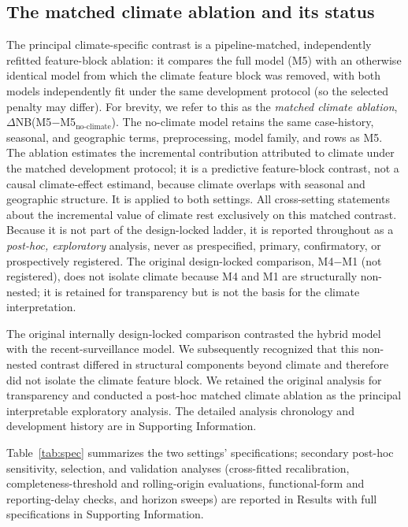 \documentclass[11pt,a4paper]{article}
\begin{document}
\subsection{The matched climate ablation and its status}
The principal climate-specific contrast is a pipeline-matched, independently refitted feature-block ablation: it compares the full model (M5) with an otherwise identical model from which the climate feature block was removed, with both models independently fit under the same development protocol (so the selected penalty may differ). For brevity, we refer to this as the \emph{matched climate ablation}, $\Delta$NB(M5$-$M5$_{\text{no-climate}}$). The no-climate model retains the same case-history, seasonal, and geographic terms, preprocessing, model family, and rows as M5. The ablation estimates the incremental contribution attributed to climate under the matched development protocol; it is a predictive feature-block contrast, not a causal climate-effect estimand, because climate overlaps with seasonal and geographic structure. It is applied to both settings. All cross-setting statements about the incremental value of climate rest exclusively on this matched contrast. Because it is not part of the design-locked ladder, it is reported throughout as a \emph{post-hoc, exploratory} analysis, never as prespecified, primary, confirmatory, or prospectively registered. The original design-locked comparison, M4$-$M1 (not registered), does not isolate climate because M4 and M1 are structurally non-nested; it is retained for transparency but is not the basis for the climate interpretation.

The original internally design-locked comparison contrasted the hybrid model with the recent-surveillance model. We subsequently recognized that this non-nested contrast differed in structural components beyond climate and therefore did not isolate the climate feature block. We retained the original analysis for transparency and conducted a post-hoc matched climate ablation as the principal interpretable exploratory analysis. The detailed analysis chronology and development history are in Supporting Information.

Table~\ref{tab:spec} summarizes the two settings' specifications; secondary post-hoc sensitivity, selection, and validation analyses (cross-fitted recalibration, completeness-threshold and rolling-origin evaluations, functional-form and reporting-delay checks, and horizon sweeps) are reported in Results with full specifications in Supporting Information.
\end{document}
